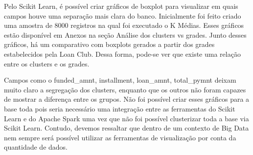 Pelo Scikit Learn, é possível criar gráficos de boxplot para visualizar em quais campos houve uma separação mais clara do banco. Inicialmente foi feito criado uma amostra de 8000 registros na qual foi executado o K Médias. Esses gráficos estão disponível em Anexos na seção Análise dos clusters vs grades. Junto desses gráficos, há um comparativo com boxplots gerados a partir dos grades estabelecidos pela Loan Club. Dessa forma, pode-se ver que existe uma relação entre os clusters e os grades.

Campos como o funded\_amnt, installment, loan\_amnt, total\_pymnt deixam muito claro a segregação dos clusters, enquanto que os outros não foram capazes de mostrar a diferença entre os grupos.
Não foi possível criar esses gráficos para a base toda pois seria necessário uma integração entre as ferramentas do Scikit Learn e do Apache Spark uma vez que não foi possível clusterizar toda a base via Scikit Learn. Contudo, devemos ressaltar que dentro de um contexto de Big Data nem sempre será possível utilizar as ferramentas de visualização por conta da quantidade de dados.


